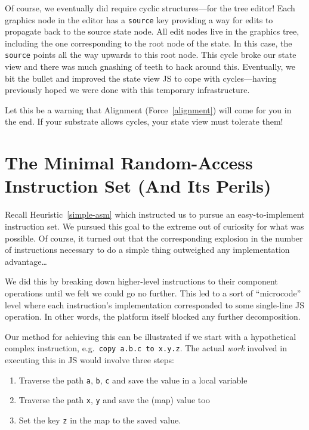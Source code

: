\documentclass[ twoside,openright,titlepage,numbers=noenddot,headinclude,footinclude,cleardoublepage=empty,abstract=on,
                BCOR=5mm,paper=a4,fontsize=11pt
                ]{scrreprt}
\providecommand{\tightlist}{}\newenvironment{longtable}[2]{\begin{tabular}}{\end{tabular}}
\theoremstyle{definition}
\begin{document}
Of course, we eventually did require cyclic structures---for the tree
editor! Each graphics node in the editor has a \texttt{source} key
providing a way for edits to propagate back to the source state node.
All edit nodes live in the graphics tree, including the one
corresponding to the root node of the state. In this case, the
\texttt{source} points all the way upwards to this root node. This cycle
broke our state view and there was much gnashing of teeth to hack around
this. Eventually, we bit the bullet and improved the state view \ac{JS}
to cope with cycles---having previously hoped we were done with this
temporary infrastructure.

Let this be a warning that Alignment (Force~\ref{alignment}) will come
for you in the end. If your substrate allows cycles, your state view
must tolerate them!

\hypertarget{the-minimal-random-access-instruction-set-and-its-perils}{\section{The Minimal Random-Access Instruction Set (And Its
Perils)}\label{the-minimal-random-access-instruction-set-and-its-perils}}

Recall Heuristic~\ref{simple-asm} which instructed us to pursue an
easy-to-implement instruction set. We pursued this goal to the extreme
out of curiosity for what was possible. Of course, it turned out that
the corresponding explosion in the number of instructions necessary to
do a simple thing outweighed any implementation advantage\ldots{}

We did this by breaking down higher-level instructions to their
component operations until we felt we could go no further. This led to a
sort of ``microcode'' level where each instruction's implementation
corresponded to some single-line \ac{JS} operation. In other words, the
platform itself blocked any further decomposition.

Our method for achieving this can be illustrated if we start with a
hypothetical complex instruction, e.g.~\texttt{copy\ a.b.c\ to\ x.y.z}.
The actual \emph{work} involved in executing this in \ac{JS} would
involve three steps:

\begin{enumerate}
\def\labelenumi{\arabic{enumi}.}
\tightlist
\item
  Traverse the path \texttt{a}, \texttt{b}, \texttt{c} and save the
  value in a local variable
\item
  Traverse the path \texttt{x}, \texttt{y} and save the (map) value too
\item
  Set the key \texttt{z} in the map to the saved value.
\end{enumerate}
\end{document}
